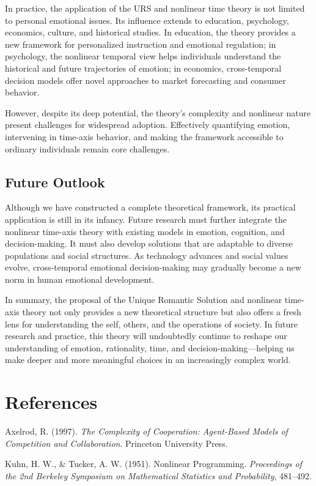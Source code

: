 \documentclass{article}
\begin{document}
In practice, the application of the URS and nonlinear time theory is not limited to personal emotional issues. Its influence extends to education, psychology, economics, culture, and historical studies. In education, the theory provides a new framework for personalized instruction and emotional regulation; in psychology, the nonlinear temporal view helps individuals understand the historical and future trajectories of emotion; in economics, cross-temporal decision models offer novel approaches to market forecasting and consumer behavior.

However, despite its deep potential, the theory’s complexity and nonlinear nature present challenges for widespread adoption. Effectively quantifying emotion, intervening in time-axis behavior, and making the framework accessible to ordinary individuals remain core challenges.

\subsection{Future Outlook}

Although we have constructed a complete theoretical framework, its practical application is still in its infancy. Future research must further integrate the nonlinear time-axis theory with existing models in emotion, cognition, and decision-making. It must also develop solutions that are adaptable to diverse populations and social structures. As technology advances and social values evolve, cross-temporal emotional decision-making may gradually become a new norm in human emotional development.

In summary, the proposal of the Unique Romantic Solution and nonlinear time-axis theory not only provides a new theoretical structure but also offers a fresh lens for understanding the self, others, and the operations of society. In future research and practice, this theory will undoubtedly continue to reshape our understanding of emotion, rationality, time, and decision-making—helping us make deeper and more meaningful choices in an increasingly complex world.

\section*{References}

Axelrod, R. (1997). \textit{The Complexity of Cooperation: Agent-Based Models of Competition and Collaboration}. Princeton University Press.

Kuhn, H. W., \& Tucker, A. W. (1951). Nonlinear Programming. \textit{Proceedings of the 2nd Berkeley Symposium on Mathematical Statistics and Probability}, 481–492.
\end{document}

